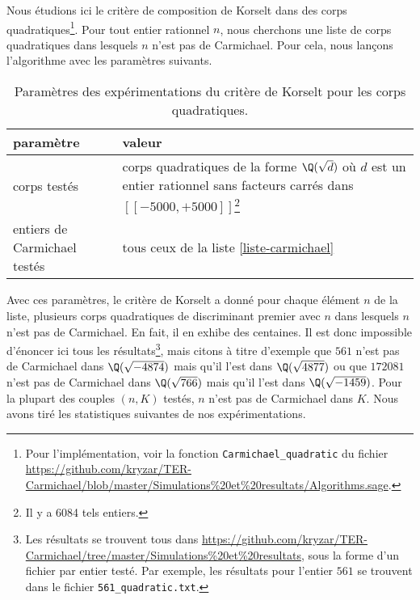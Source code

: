 Nous étudions ici le critère de composition de Korselt \label{test-primalite-korselt} dans des corps quadratiques\footnote{Pour l'implémentation, voir la fonction \texttt{Carmichael\_quadratic} du fichier \url{https://github.com/kryzar/TER-Carmichael/blob/master/Simulations\%20et\%20resultats/Algorithms.sage}.}. Pour tout entier rationnel $n$, nous cherchons une liste de corps quadratiques dans lesquels $n$ n'est pas de Carmichael. Pour cela, nous lançons l'algorithme avec les paramètres suivants.

\begin{table}[H]\label{param-korselt-quadra}
	\begin{center}
		\begin{tabularx}{\textwidth}{|Y|Y|}
			\hline
			paramètre & valeur \\
			\hline
			\hline
			corps testés & corps quadratiques de la forme $\Q(\sqrt{d})$ où $d$ est un entier rationnel sans facteurs carrés dans $[\![-5000, +5000]\!]$\footnote{Il y a 6084 tels entiers.} \\\hline
			entiers de Carmichael testés & tous ceux de la liste \ref{liste-carmichael}  \\\hline
		\end{tabularx}
		\caption{Paramètres des expérimentations du critère de Korselt pour les corps quadratiques.}
	\end{center}
\end{table}

Avec ces paramètres, le critère de Korselt a donné pour chaque élément $n$ de la liste, plusieurs corps quadratiques de discriminant premier avec $n$ dans lesquels $n$ n'est pas de Carmichael. En fait, il en exhibe des centaines. Il est donc impossible d'énoncer ici tous les résultats\footnote{Les résultats se trouvent tous dans \url{https://github.com/kryzar/TER-Carmichael/tree/master/Simulations\%20et\%20resultats}, sous la forme d'un fichier par entier testé. Par exemple, les résultats pour l'entier $561$ se trouvent dans le fichier \texttt{561\_quadratic.txt}.}, mais citons à titre d'exemple que $561$ n'est pas de Carmichael dans $\Q(\sqrt{-4874})$ mais qu'il l'est dans $\Q(\sqrt{4877})$ ou que $172081$ n'est pas de Carmichael dans $\Q(\sqrt{766})$ mais qu'il l'est dans $\Q(\sqrt{-1459})$.  Pour la plupart des couples $(n, K)$ testés, $n$ n'est pas de Carmichael dans $K$. Nous avons tiré les statistiques suivantes de nos expérimentations.

